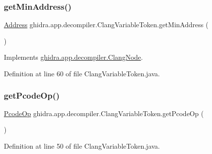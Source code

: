 \subsubsection{\texorpdfstring{getMinAddress()}{getMinAddress()}}
{\footnotesize\ttfamily \mbox{\hyperlink{class_address}{Address}} ghidra.\+app.\+decompiler.\+Clang\+Variable\+Token.\+get\+Min\+Address (\begin{DoxyParamCaption}{ }\end{DoxyParamCaption})\hspace{0.3cm}{\ttfamily [inline]}}



Implements \mbox{\hyperlink{interfaceghidra_1_1app_1_1decompiler_1_1_clang_node_a28f86ac40636cd77392e26367db69dc3}{ghidra.\+app.\+decompiler.\+Clang\+Node}}.



Definition at line 60 of file Clang\+Variable\+Token.\+java.

\mbox{\label{classghidra_1_1app_1_1decompiler_1_1_clang_variable_token_a71fdcebf2fbb462277d93df4a6ab846c}} 
\subsubsection{\texorpdfstring{getPcodeOp()}{getPcodeOp()}}
{\footnotesize\ttfamily \mbox{\hyperlink{class_pcode_op}{Pcode\+Op}} ghidra.\+app.\+decompiler.\+Clang\+Variable\+Token.\+get\+Pcode\+Op (\begin{DoxyParamCaption}{ }\end{DoxyParamCaption})\hspace{0.3cm}{\ttfamily [inline]}}



Definition at line 50 of file Clang\+Variable\+Token.\+java.

\mbox{\label{classghidra_1_1app_1_1decompiler_1_1_clang_variable_token_a1ca7e13dba091811591ea0b8058b1d71}} 
